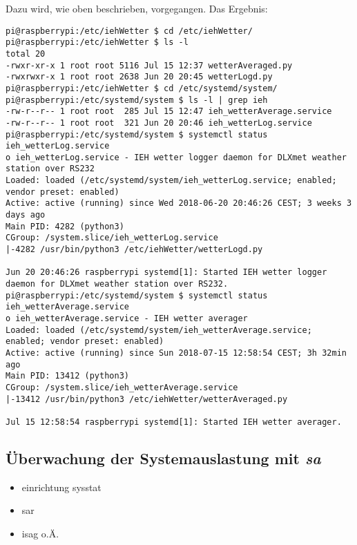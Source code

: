 Dazu wird, wie oben beschrieben, vorgegangen. Das Ergebnis:
\begin{lstlisting}
pi@raspberrypi:/etc/iehWetter $ cd /etc/iehWetter/
pi@raspberrypi:/etc/iehWetter $ ls -l
total 20
-rwxr-xr-x 1 root root 5116 Jul 15 12:37 wetterAveraged.py
-rwxrwxr-x 1 root root 2638 Jun 20 20:45 wetterLogd.py
pi@raspberrypi:/etc/iehWetter $ cd /etc/systemd/system/
pi@raspberrypi:/etc/systemd/system $ ls -l | grep ieh
-rw-r--r-- 1 root root  285 Jul 15 12:47 ieh_wetterAverage.service
-rw-r--r-- 1 root root  321 Jun 20 20:46 ieh_wetterLog.service
pi@raspberrypi:/etc/systemd/system $ systemctl status ieh_wetterLog.service 
o ieh_wetterLog.service - IEH wetter logger daemon for DLXmet weather station over RS232
Loaded: loaded (/etc/systemd/system/ieh_wetterLog.service; enabled; vendor preset: enabled)
Active: active (running) since Wed 2018-06-20 20:46:26 CEST; 3 weeks 3 days ago
Main PID: 4282 (python3)
CGroup: /system.slice/ieh_wetterLog.service
|-4282 /usr/bin/python3 /etc/iehWetter/wetterLogd.py

Jun 20 20:46:26 raspberrypi systemd[1]: Started IEH wetter logger daemon for DLXmet weather station over RS232.
pi@raspberrypi:/etc/systemd/system $ systemctl status ieh_wetterAverage.service 
o ieh_wetterAverage.service - IEH wetter averager
Loaded: loaded (/etc/systemd/system/ieh_wetterAverage.service; enabled; vendor preset: enabled)
Active: active (running) since Sun 2018-07-15 12:58:54 CEST; 3h 32min ago
Main PID: 13412 (python3)
CGroup: /system.slice/ieh_wetterAverage.service
|-13412 /usr/bin/python3 /etc/iehWetter/wetterAveraged.py

Jul 15 12:58:54 raspberrypi systemd[1]: Started IEH wetter averager.
\end{lstlisting}



\subsection{Überwachung der Systemauslastung mit \textit{sa}}

\begin{itemize}
	\item einrichtung sysstat
	\item sar
	\item isag o.Ä.
\end{itemize}











